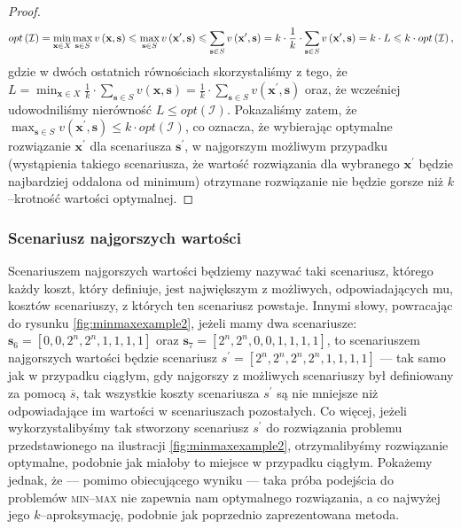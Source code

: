 \begin{proof}
	\begin{eqnarray}
		opt \left( \mathcal{I} \right) = \min_{ \mathclap{\textbf{x} \in X}} \max_{\textbf{s} \in S} v \left( \textbf{x}, \textbf{s} \right) \leqslant \max_{\textbf{s} \in S} v \left( \textbf{x}^{\prime}, \textbf{s} \right) \leqslant \sum_{\textbf{s} \in S} v \left( \textbf{x}^{\prime}, \textbf{s} \right) = k \cdot \frac{1}{k} \cdot \sum_{\textbf{s} \in S} v \left( \textbf{x}^{\prime}, \textbf{s} \right) = k \cdot L \leqslant k \cdot opt \left( \mathcal{I} \right)\text{,}
	\end{eqnarray}
	gdzie w dwóch ostatnich równościach skorzystaliśmy z tego, że $L = \min_{ \textbf{x} \in X} \frac{1}{k} \cdot \sum_{\textbf{s} \in S} v \left( \textbf{x}, \textbf{s} \right) = \frac{1}{k} \cdot \sum_{\textbf{s} \in S} v \left( \textbf{x}^{\prime}, \textbf{s} \right)$ oraz, że wcześniej udowodniliśmy nierówność $L \leqslant opt \left( \mathcal{I} \right)$. Pokazaliśmy zatem, że $\max_{\textbf{s} \in S} v \left( \textbf{x}^{\prime}, \textbf{s} \right) \leqslant k \cdot opt \left( \mathcal{I} \right)$, co oznacza, że wybierając optymalne rozwiązanie $\textbf{x}^{\prime}$ dla scenariusza $\textbf{s}^{\prime}$, w najgorszym możliwym przypadku (wystąpienia takiego scenariusza, że wartość rozwiązania dla wybranego $\textbf{x}^{\prime}$ będzie najbardziej oddalona od minimum) otrzymane rozwiązanie nie będzie gorsze niż $k$--krotność wartości optymalnej.
\end{proof}

\subsubsection{Scenariusz najgorszych wartości}

Scenariuszem najgorszych wartości będziemy nazywać taki scenariusz, którego każdy koszt, który definiuje, jest największym z możliwych, odpowiadających mu, kosztów scenariuszy, z których ten scenariusz powstaje. Innymi słowy, powracając do rysunku \ref{fig:minmaxexample2}, jeżeli mamy dwa scenariusze: $\textbf{s}_{6} = \left[ 0, 0, 2^{n}, 2^{n}, 1, 1, 1, 1 \right]$ oraz $\textbf{s}_{7} = \left[ 2^{n}, 2^{n}, 0, 0, 1, 1, 1, 1 \right]$, to scenariuszem najgorszych wartości będzie scenariusz $s^{\prime} = \left[ 2^{n}, 2^{n}, 2^{n}, 2^{n}, 1, 1, 1, 1 \right]$ --- tak samo jak w przypadku ciągłym, gdy najgorszy z możliwych scenariuszy był definiowany za pomocą $\overline{s}$, tak wszystkie koszty scenariusza $s^{\prime}$ są nie mniejsze niż odpowiadające im wartości w scenariuszach pozostałych. Co więcej, jeżeli wykorzystalibyśmy tak stworzony scenariusz $s^{\prime}$ do rozwiązania problemu przedstawionego na ilustracji \ref{fig:minmaxexample2}, otrzymalibyśmy rozwiązanie optymalne, podobnie jak miałoby to miejsce w przypadku ciągłym. Pokażemy jednak, że --- pomimo obiecującego wyniku --- taka próba podejścia do problemów \textsc{min--max} nie zapewnia nam optymalnego rozwiązania, a co najwyżej jego $k$--aproksymację, podobnie jak poprzednio zaprezentowana metoda.

